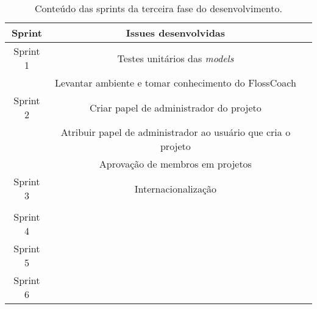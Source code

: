 \begin{table}[h]
	\centering
	\label{tab01}
	
	\begin{tabular}{ccc}
		\toprule
		\textbf{Sprint} & \textbf{Issues desenvolvidas} \\
		\midrule
		Sprint 1 & Testes unitários das \textit{models} \\
			 & Levantar ambiente e tomar conhecimento do FlossCoach \\
		\midrule
		Sprint 2 & Criar papel de administrador do projeto\\
			 & Atribuir papel de administrador ao usuário que cria o projeto \\
			 & Aprovação de membros em projetos \\
		\midrule		
		Sprint 3 & Internacionalização \\
			 & \\
		\midrule		
		Sprint 4 & \\
		\midrule		
		Sprint 5 & \\
		\midrule
		Sprint 6 & \\
		\bottomrule
	\end{tabular}

	\caption{Conteúdo das sprints da terceira fase do desenvolvimento.}
\end{table}
